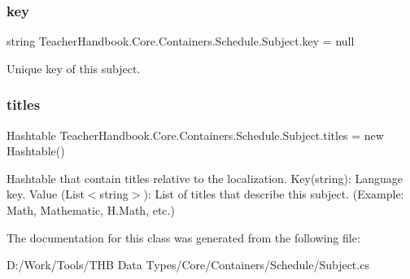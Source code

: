 \subsubsection{\texorpdfstring{key}{key}}
{\footnotesize\ttfamily string Teacher\+Handbook.\+Core.\+Containers.\+Schedule.\+Subject.\+key = null}



Unique key of this subject. 

\mbox{\label{class_teacher_handbook_1_1_core_1_1_containers_1_1_schedule_1_1_subject_ac024684f42182cdbcf4ae477395f92a1}} 
\subsubsection{\texorpdfstring{titles}{titles}}
{\footnotesize\ttfamily Hashtable Teacher\+Handbook.\+Core.\+Containers.\+Schedule.\+Subject.\+titles = new Hashtable()}



Hashtable that contain titles relative to the localization. Key(string)\+: Language key. Value (List$<$string$>$)\+: List of titles that describe this subject. (Example\+: Math, Mathematic, H.\+Math, etc.) 



The documentation for this class was generated from the following file\+:\begin{DoxyCompactItemize}
\item 
D\+:/\+Work/\+Tools/\+T\+H\+B Data Types/\+Core/\+Containers/\+Schedule/Subject.\+cs\end{DoxyCompactItemize}
